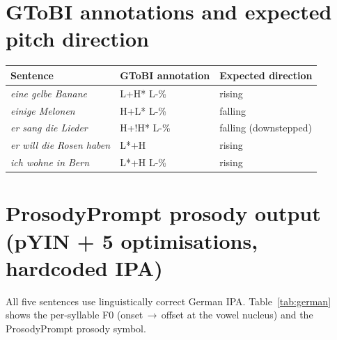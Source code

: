 \section*{GToBI annotations and expected pitch direction}

\begin{table}[h]
\centering
\small
\begin{tabular}{lll}
\toprule
Sentence & GToBI annotation & Expected direction \\
\midrule
\textit{eine gelbe Banane}       & L+H* L-\%  & rising \\
\textit{einige Melonen}          & H+L* L-\%  & falling \\
\textit{er sang die Lieder}      & H+!H* L-\% & falling (downstepped) \\
\textit{er will die Rosen haben} & L*+H       & rising \\
\textit{ich wohne in Bern}       & L*+H L-\%  & rising \\
\bottomrule
\end{tabular}
\end{table}

\section*{ProsodyPrompt prosody output (pYIN + 5 optimisations, hardcoded IPA)}

All five sentences use linguistically correct German IPA.
Table~\ref{tab:german} shows the per-syllable F0 (onset\,$\to$\,offset at the
vowel nucleus) and the ProsodyPrompt prosody symbol.

